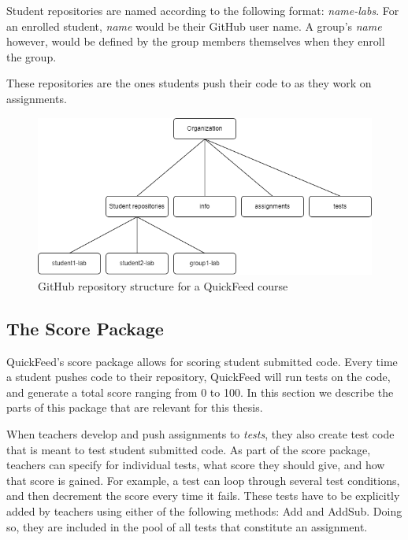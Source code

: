 Student repositories are named according to the following format: \textit{name-labs}.
For an enrolled student, \textit{name} would be their GitHub user name.
A group's \textit{name} however, would be defined by the group members themselves when they enroll the group.

These repositories are the ones students push their code to as they work on assignments.

\begin{figure}[ht]
    \centering
    \includegraphics[width=\textwidth]{photos/qf-repository-structure.png}
    \caption{GitHub repository structure for a QuickFeed course}
    \label{fig:qf-repository-structure}
\end{figure}

\subsection{The Score Package}
\label{sec:the-score-package}

QuickFeed's score package allows for scoring student submitted code.
Every time a student pushes code to their repository, QuickFeed will run tests on the code, and generate a total score ranging from 0 to 100.
In this section we describe the parts of this package that are relevant for this thesis.

When teachers develop and push assignments to \textit{tests}, they also create test code that is meant to test student submitted code.
As part of the score package, teachers can specify for individual tests, what score they should give, and how that score is gained.
For example, a test can loop through several test conditions, and then decrement the score every time it fails.
These tests have to be explicitly added by teachers using either of the following methods: Add and AddSub.
Doing so, they are included in the pool of all tests that constitute an assignment.

